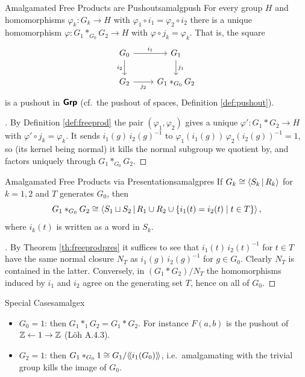 \begin{proposition}{Amalgamated Free Products are Pushouts}{amalgpush}
  For every group $H$ and homomorphisms $\varphi_k:G_k\to H$ with $\varphi_1\circ i_1=\varphi_2\circ i_2$ there is a unique homomorphism $\varphi:G_1\ast_{G_0}G_2\to H$ with $\varphi\circ j_k=\varphi_k$. That is, the square
  \[
  \begin{tikzcd}
    G_0 \ar[r, "i_1"] \ar[d, "i_2"'] & G_1 \ar[d, "j_1"] \\
    G_2 \ar[r, "j_2"'] & G_1\ast_{G_0}G_2
  \end{tikzcd}
  \]
  is a pushout in $\bm{\mathsf{Grp}}$ (cf.\ the pushout of spaces, Definition \ref{def:pushout}).
\end{proposition}

\begin{proof}[]
  By Definition \ref{def:freeprod} the pair $(\varphi_1,\varphi_2)$ gives a unique $\varphi':G_1\ast G_2\to H$ with $\varphi'\circ j_k=\varphi_k$. It sends $i_1(g)\,i_2(g)^{-1}$ to $\varphi_1(i_1(g))\,\varphi_2(i_2(g))^{-1}=1$, so (its kernel being normal) it kills the normal subgroup we quotient by, and factors uniquely through $G_1\ast_{G_0}G_2$.
\end{proof}

\begin{corollary}{Amalgamated Free Products via Presentations}{amalgpres}
  If $G_k\cong\left\langle S_k\,\middle|\,R_k\right\rangle$ for $k=1,2$ and $T$ generates $G_0$, then
  \[
    G_1\ast_{G_0}G_2\cong\left\langle S_1\sqcup S_2\,\middle|\,R_1\cup R_2\cup\{i_1(t)=i_2(t)\mid t\in T\}\right\rangle,
  \]
  where $i_k(t)$ is written as a word in $S_k$.
\end{corollary}

\begin{proof}[]
  By Theorem \ref{th:freeprodpres} it suffices to see that $i_1(t)\,i_2(t)^{-1}$ for $t\in T$ have the same normal closure $N_T$ as $i_1(g)\,i_2(g)^{-1}$ for $g\in G_0$. Clearly $N_T$ is contained in the latter. Conversely, in $(G_1\ast G_2)/N_T$ the homomorphisms induced by $i_1$ and $i_2$ agree on the generating set $T$, hence on all of $G_0$.
\end{proof}

\begin{example}{Special Cases}{amalgex}
  \begin{itemize}
    \item $G_0=1$: then $G_1\ast_{1}G_2=G_1\ast G_2$. For instance $F(a,b)$ is the pushout of $\mathbb{Z}\leftarrow1\to\mathbb{Z}$ (Löh A.4.3).
    \item $G_2=1$: then $G_1\ast_{G_0}1\cong G_1/\langle\!\langle i_1(G_0)\rangle\!\rangle$, i.e.\ amalgamating with the trivial group kills the image of $G_0$.
  \end{itemize}
\end{example}

